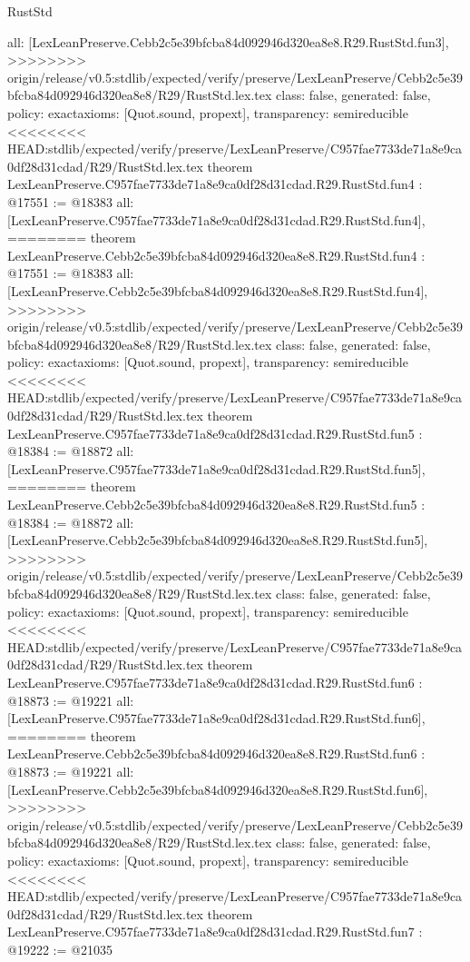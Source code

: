 \begin{lexlean}{RustStd}
\begin{coremodule}
{\begin{coremodule}
{{{{{{{  all: [LexLeanPreserve.Cebb2c5e39bfcba84d092946d320ea8e8.R29.RustStd.fun3],
>>>>>>>> origin/release/v0.5:stdlib/expected/verify/preserve/LexLeanPreserve/Cebb2c5e39bfcba84d092946d320ea8e8/R29/RustStd.lex.tex
  class: false,
  generated: false,
  policy: exact{axioms: [Quot.sound, propext]},
  transparency: semireducible
}
<<<<<<<< HEAD:stdlib/expected/verify/preserve/LexLeanPreserve/C957fae7733de71a8e9ca0df28d31cdad/R29/RustStd.lex.tex
theorem LexLeanPreserve.C957fae7733de71a8e9ca0df28d31cdad.R29.RustStd.fun4 : @17551 := @18383 {
  all: [LexLeanPreserve.C957fae7733de71a8e9ca0df28d31cdad.R29.RustStd.fun4],
========
theorem LexLeanPreserve.Cebb2c5e39bfcba84d092946d320ea8e8.R29.RustStd.fun4 : @17551 := @18383 {
  all: [LexLeanPreserve.Cebb2c5e39bfcba84d092946d320ea8e8.R29.RustStd.fun4],
>>>>>>>> origin/release/v0.5:stdlib/expected/verify/preserve/LexLeanPreserve/Cebb2c5e39bfcba84d092946d320ea8e8/R29/RustStd.lex.tex
  class: false,
  generated: false,
  policy: exact{axioms: [Quot.sound, propext]},
  transparency: semireducible
}
<<<<<<<< HEAD:stdlib/expected/verify/preserve/LexLeanPreserve/C957fae7733de71a8e9ca0df28d31cdad/R29/RustStd.lex.tex
theorem LexLeanPreserve.C957fae7733de71a8e9ca0df28d31cdad.R29.RustStd.fun5 : @18384 := @18872 {
  all: [LexLeanPreserve.C957fae7733de71a8e9ca0df28d31cdad.R29.RustStd.fun5],
========
theorem LexLeanPreserve.Cebb2c5e39bfcba84d092946d320ea8e8.R29.RustStd.fun5 : @18384 := @18872 {
  all: [LexLeanPreserve.Cebb2c5e39bfcba84d092946d320ea8e8.R29.RustStd.fun5],
>>>>>>>> origin/release/v0.5:stdlib/expected/verify/preserve/LexLeanPreserve/Cebb2c5e39bfcba84d092946d320ea8e8/R29/RustStd.lex.tex
  class: false,
  generated: false,
  policy: exact{axioms: [Quot.sound, propext]},
  transparency: semireducible
}
<<<<<<<< HEAD:stdlib/expected/verify/preserve/LexLeanPreserve/C957fae7733de71a8e9ca0df28d31cdad/R29/RustStd.lex.tex
theorem LexLeanPreserve.C957fae7733de71a8e9ca0df28d31cdad.R29.RustStd.fun6 : @18873 := @19221 {
  all: [LexLeanPreserve.C957fae7733de71a8e9ca0df28d31cdad.R29.RustStd.fun6],
========
theorem LexLeanPreserve.Cebb2c5e39bfcba84d092946d320ea8e8.R29.RustStd.fun6 : @18873 := @19221 {
  all: [LexLeanPreserve.Cebb2c5e39bfcba84d092946d320ea8e8.R29.RustStd.fun6],
>>>>>>>> origin/release/v0.5:stdlib/expected/verify/preserve/LexLeanPreserve/Cebb2c5e39bfcba84d092946d320ea8e8/R29/RustStd.lex.tex
  class: false,
  generated: false,
  policy: exact{axioms: [Quot.sound, propext]},
  transparency: semireducible
}
<<<<<<<< HEAD:stdlib/expected/verify/preserve/LexLeanPreserve/C957fae7733de71a8e9ca0df28d31cdad/R29/RustStd.lex.tex
theorem LexLeanPreserve.C957fae7733de71a8e9ca0df28d31cdad.R29.RustStd.fun7 : @19222 := @21035 {
}}}}}}}}}}
\end{coremodule}}
\end{coremodule}
\end{lexlean}
